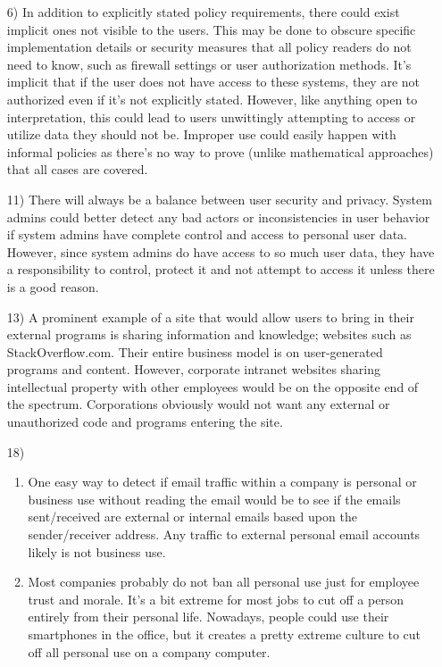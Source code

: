 \documentclass[journal,onecolumn]{IEEEtran}
\begin{document}
\begin{enumerate}
  \item [6)] In addition to explicitly stated policy requirements, there could exist implicit ones not visible to the users. This may be done to obscure specific implementation details or security measures that all policy readers do not need to know, such as firewall settings or user authorization methods. It's implicit that if the user does not have access to these systems, they are not authorized even if it's not explicitly stated. However, like anything open to interpretation, this could lead to users unwittingly attempting to access or utilize data they should not be. Improper use could easily happen with informal policies as there's no way to prove (unlike mathematical approaches) that all cases are covered.
  \item [11)] There will always be a balance between user security and privacy. System admins could better detect any bad actors or inconsistencies in user behavior if system admins have complete control and access to personal user data. However, since system admins do have access to so much user data, they have a responsibility to control, protect it and not attempt to access it unless there is a good reason.
  \item [13)] A prominent example of a site that would allow users to bring in their external programs is sharing information and knowledge; websites such as StackOverflow.com. Their entire business model is on user-generated programs and content. However, corporate intranet websites sharing intellectual property with other employees would be on the opposite end of the spectrum. Corporations obviously would not want any external or unauthorized code and programs entering the site.
  \item [18)]   
    \begin{enumerate} 
      \item One easy way to detect if email traffic within a company is personal or business use without reading the email would be to see if the emails sent/received are external or internal emails based upon the sender/receiver address. Any traffic to external personal email accounts likely is not business use.
      \item Most companies probably do not ban all personal use just for employee trust and morale. It's a bit extreme for most jobs to cut off a person entirely from their personal life. Nowadays, people could use their smartphones in the office, but it creates a pretty extreme culture to cut off all personal use on a company computer. 
    \end{enumerate}
\end{enumerate}
\end{document}

